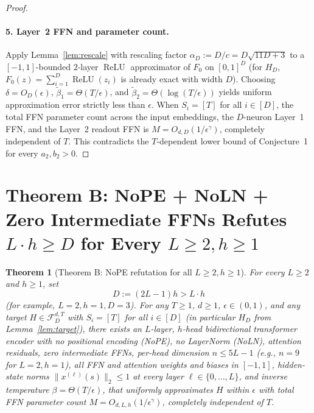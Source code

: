 \documentclass[11pt]{article}
\theoremstyle{plain}
\newtheorem{theorem}{Theorem}
\theoremstyle{definition}
\theoremstyle{remark}
\DeclareMathOperator{\ReLU}{ReLU}
\newcommand{\1}{\mathbf{1}}
\begin{document}
\begin{proof}
\paragraph{5. Layer~2 FFN and parameter count.}
Apply Lemma~\ref{lem:rescale} with rescaling factor $\alpha_D := D/c = D\sqrt{11D + 3}$ to a $[-1,1]$-bounded $2$-layer $\ReLU$ approximator of $F_0$ on $[0,1]^D$ (for $H_D$, $F_0(z) = \sum_{i=1}^D \ReLU(z_i)$ is already exact with width $D$). Choosing $\delta = O_D(\epsilon)$, $\tilde{\beta}_1 = \Theta(T/\epsilon)$, and $\tilde{\beta}_2 = \Theta(\log(T/\epsilon))$ yields uniform approximation error strictly less than $\epsilon$. When $S_i = [T]$ for all $i \in [D]$, the total FFN parameter count across the input embeddings, the $D$-neuron Layer~1 FFN, and the Layer~2 readout FFN is $M = O_{d,D}(1/\epsilon^\gamma)$, completely independent of $T$. This contradicts the $T$-dependent lower bound of Conjecture~1 for every $a_2, b_2 > 0$.
\end{proof}

\section{Theorem B: NoPE + NoLN + Zero Intermediate FFNs Refutes $L \cdot h \ge D$ for Every $L \ge 2, h \ge 1$}

\begin{theorem}[Theorem B: NoPE refutation for all $L \ge 2, h \ge 1$]\label{thm:B}
For every $L \ge 2$ and $h \ge 1$, set
\[
D := (2L - 1)h > L \cdot h
\]
(for example, $L = 2, h = 1, D = 3$). For any $T \ge 1$, $d \ge 1$, $\epsilon \in (0, 1)$, and any target $H \in \mathcal{F}_D^{d,T}$ with $S_i = [T]$ for all $i \in [D]$ (in particular $H_D$ from Lemma~\ref{lem:target}), there exists an $L$-layer, $h$-head bidirectional transformer encoder with \emph{no positional encoding} (NoPE), \emph{no LayerNorm} (NoLN), attention residuals, \emph{zero intermediate FFNs}, per-head dimension $n \le 5L - 1$ (e.g., $n = 9$ for $L = 2, h = 1$), all FFN and attention weights and biases in $[-1,1]$, hidden-state norms $\|x^{(\ell)}(s)\|_2 \le 1$ at every layer $\ell \in \{0, \dots, L\}$, and inverse temperature $\beta = \Theta(T/\epsilon)$, that uniformly approximates $H$ within $\epsilon$ with total FFN parameter count $M = O_{d,L,h}(1/\epsilon^\gamma)$, completely independent of $T$.
\end{theorem}
\end{document}
